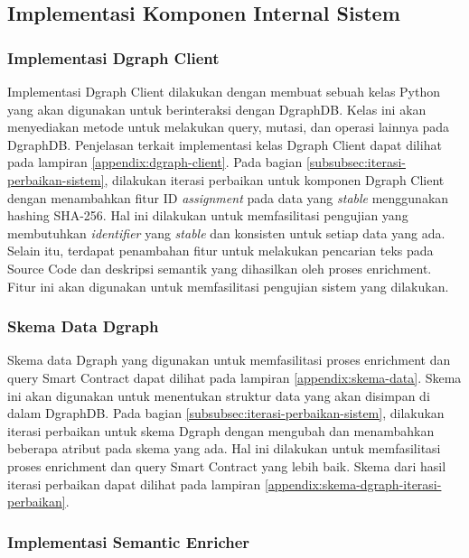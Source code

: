 \subsection{Implementasi Komponen Internal Sistem}

\subsubsection{Implementasi Dgraph Client}

Implementasi Dgraph Client dilakukan dengan membuat sebuah kelas Python yang akan digunakan untuk berinteraksi dengan DgraphDB. Kelas ini akan menyediakan metode untuk melakukan query, mutasi, dan operasi lainnya pada DgraphDB. Penjelasan terkait implementasi kelas Dgraph Client dapat dilihat pada lampiran \ref{appendix:dgraph-client}. Pada bagian \ref{subsubsec:iterasi-perbaikan-sistem}, dilakukan iterasi perbaikan untuk komponen Dgraph Client dengan menambahkan fitur ID \textit{assignment} pada data yang \textit{stable} menggunakan hashing SHA-256. Hal ini dilakukan untuk memfasilitasi pengujian yang membutuhkan \textit{identifier} yang \textit{stable} dan konsisten untuk setiap data yang ada. Selain itu, terdapat penambahan fitur untuk melakukan pencarian teks pada Source Code dan deskripsi semantik yang dihasilkan oleh proses enrichment. Fitur ini akan digunakan untuk memfasilitasi pengujian sistem yang dilakukan.

\subsubsection{Skema Data Dgraph}

Skema data Dgraph yang digunakan untuk memfasilitasi proses enrichment dan query Smart Contract dapat dilihat pada lampiran \ref{appendix:skema-data}. Skema ini akan digunakan untuk menentukan struktur data yang akan disimpan di dalam DgraphDB. Pada bagian \ref{subsubsec:iterasi-perbaikan-sistem}, dilakukan iterasi perbaikan untuk skema Dgraph dengan mengubah dan menambahkan beberapa atribut pada skema yang ada. Hal ini dilakukan untuk memfasilitasi proses enrichment dan query Smart Contract yang lebih baik. Skema dari hasil iterasi perbaikan dapat dilihat pada lampiran \ref{appendix:skema-dgraph-iterasi-perbaikan}.

\subsubsection{Implementasi Semantic Enricher}

